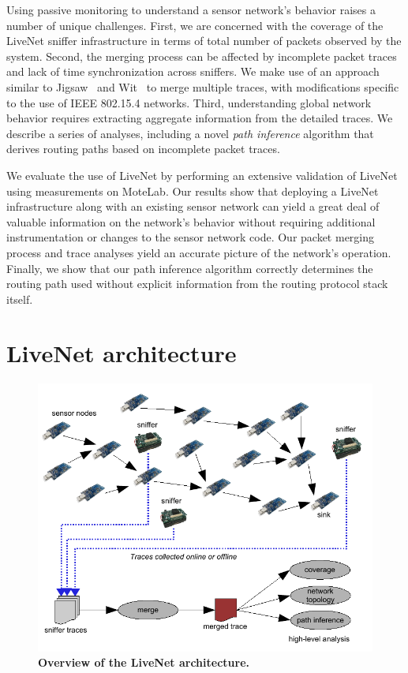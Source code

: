 Using passive monitoring to understand a sensor network's behavior
raises a number of unique challenges. First, we are concerned with the
coverage of the LiveNet sniffer infrastructure in terms of total
number of packets observed by the system. Second, the merging process 
can be affected by incomplete packet traces and lack of time
synchronization across sniffers. We make use of an approach similar to
Jigsaw~\cite{jigsaw} and Wit~\cite{wit} to merge multiple traces, with
modifications specific to the use of IEEE 802.15.4 networks. Third,
understanding global network behavior requires extracting aggregate
information from the detailed traces. We describe a series of
analyses, including a novel {\em path inference} algorithm 
that derives routing paths based on incomplete packet traces.


We evaluate the use of LiveNet by performing an extensive validation 
of LiveNet using measurements on MoteLab.
Our results show that deploying a LiveNet infrastructure along with an
existing sensor network can yield a great deal of valuable information
on the network's behavior without requiring additional instrumentation
or changes to the sensor network code. Our packet merging process and 
trace analyses yield an accurate picture of the network's operation.
Finally, we show that our path inference algorithm correctly determines 
the routing path used without explicit information from the routing
protocol stack itself. 



\section{LiveNet architecture}
\label{sec-livenet-arch}

\begin{figure}[t]
\begin{center}
\includegraphics[width=0.6\hsize]{./resources/livenet-sensys07/figs/arch.pdf}
\end{center}
\caption{\small {\bf Overview of the LiveNet architecture.}}
\label{fig-arch}
\end{figure}

